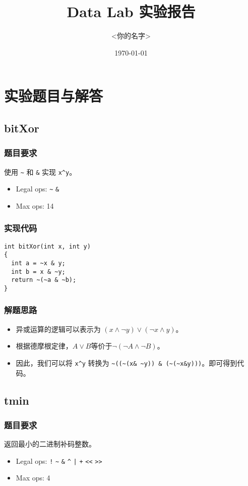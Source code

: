 \documentclass{article}
\title{Data Lab 实验报告}
\author{<你的名字>}
\date{\today}
\begin{document}
\maketitle

\section{实验题目与解答}

\subsection{bitXor}
\subsubsection{题目要求}
使用 \texttt{\~{}} 和 \texttt{\&} 实现 \texttt{x\^{}y}。
\begin{itemize}
    \item Legal ops: \texttt{\~{}} \texttt{\&}
    \item Max ops: 14
\end{itemize}

\subsubsection{实现代码}
\begin{lstlisting}[caption={bitXor}]
int bitXor(int x, int y)
{
  int a = ~x & y;
  int b = x & ~y;
  return ~(~a & ~b);
}
\end{lstlisting}

\subsubsection{解题思路}
\begin{itemize}
  \item 异或运算的逻辑可以表示为 $(x\wedge \neg y) \vee (\neg x \wedge y)$。
  \item 根据德摩根定律，$A \vee B$等价于$\neg (\neg A \wedge \neg B)$。
  \item 因此，我们可以将 \texttt{x\^{}y} 转换为 \texttt{\~{}((\~{}(x\& \~{}y)) \& (\~{}(\~{}x\&y)))}。即可得到代码。
\end{itemize}

\subsection{tmin}
\subsubsection{题目要求}
返回最小的二进制补码整数。
\begin{itemize}
    \item Legal ops: \texttt{!} \texttt{\~{}} \texttt{\&} \texttt{\^{}} \texttt{|} \texttt{+} \texttt{<<} \texttt{>>}
    \item Max ops: 4
\end{itemize}
\end{document}
